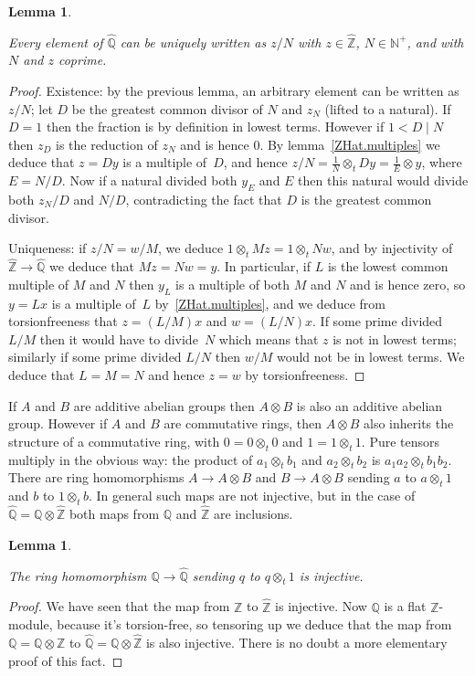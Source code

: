 \documentclass[10pt,a4paper]{article}
\newcommand{\Z}{\mathbb{Z}}
\newcommand{\N}{\mathbb{N}}
\newcommand{\Q}{\mathbb{Q}}
\newcommand{\Qhat}{\widehat{\Q}}
\newcommand{\Zhat}{\widehat{\Z}}
\newtheorem{lemma}[theorem]{Lemma}
\newcommand{\uses}[1]{}
\newcommand{\lean}[1]{}
\newcommand{\leanok}{}
\begin{document}
\begin{lemma}
    \label{QHat.lowestTerms}
    \lean{QHat.lowestTerms}
    \uses{QHat.IsCoprime}
    \leanok
    Every element of $\Qhat$ can be uniquely written as $z/N$ with $z\in\Zhat$, $N\in\N^+$,
    and with $N$ and $z$ coprime.
\end{lemma}
\begin{proof}
    Existence: by the previous lemma, an arbitrary element can be written as $z/N$; let $D$
    be the greatest common divisor of $N$ and $z_N$ (lifted to a natural). If $D=1$
    then the fraction is by definition in lowest terms. However if $1<D\mid N$ then $z_D$
    is the reduction of $z_N$ and is hence 0. By lemma~\ref{ZHat.multiples} we deduce that $z=Dy$
    is a multiple of~$D$, and hence $z/N=\frac{1}{N}\otimes_tDy=\frac{1}{E}\otimes y$, where
    $E=N/D$. Now if a natural divided both $y_E$ and $E$ then this natural would divide both $z_N/D$
    and $N/D$, contradicting the fact that $D$ is the greatest common divisor.

    Uniqueness: if $z/N=w/M$, we deduce $1\otimes_t Mz=1\otimes_t Nw$,
    and by injectivity of $\Zhat\to\Qhat$ we deduce that $Mz=Nw=y$.
    In particular, if $L$ is the lowest common multiple of $M$ and $N$ then $y_L$ is a multiple of both $M$ and $N$ and is
    hence zero, so $y=Lx$ is a multiple of~$L$ by~\ref{ZHat.multiples}, and we deduce
    from torsionfreeness that $z=(L/M)x$ and $w=(L/N)x$. If some prime divided $L/M$
    then it would have to divide~$N$ which means that $z$ is not in lowest terms;
    similarly if some prime divided $L/N$ then $w/M$ would not be in lowest terms.
    We deduce that $L=M=N$ and hence $z=w$ by torsionfreeness.
\end{proof}

If $A$ and $B$ are additive abelian groups then $A\otimes B$ is also an additive abelian group.
However if $A$ and $B$ are commutative rings, then $A\otimes B$ also inherits the structure
of a commutative ring, with $0=0\otimes_t 0$ and $1=1\otimes_t 1$. Pure tensors multiply in the
obvious way: the product of $a_1\otimes_t b_1$ and $a_2\otimes_t b_2$ is $a_1a_2\otimes_t b_1b_2.$
There are ring homomorphisms $A\to A\otimes B$ and $B\to A\otimes B$ sending $a$ to $a\otimes_t 1$
and $b$ to $1\otimes_t b$. In general such maps are not injective, but in the case of
$\Qhat=\Q\otimes\Zhat$ both maps from $\Q$ and $\Zhat$ are inclusions.

\begin{lemma}
    \label{QHat.injective_rat}
    \lean{QHat.injective_rat}
    \uses{QHat,ZHat.commRing}
    \leanok
    The ring homomorphism $\Q\to\Qhat$ sending $q$ to $q\otimes_t 1$
    is injective.
\end{lemma}
\begin{proof} \leanok
    We have seen that the map from $\Z$ to $\Zhat$ is
    injective. Now $\Q$ is a flat $\Z$-module, because it's
    torsion-free, so tensoring up we deduce that the map
    from $\Q=\Q\otimes\Z$ to $\Qhat=\Q\otimes\Zhat$ is also injective.
    There is no doubt a more elementary proof of this fact.
\end{proof}
\end{document}
